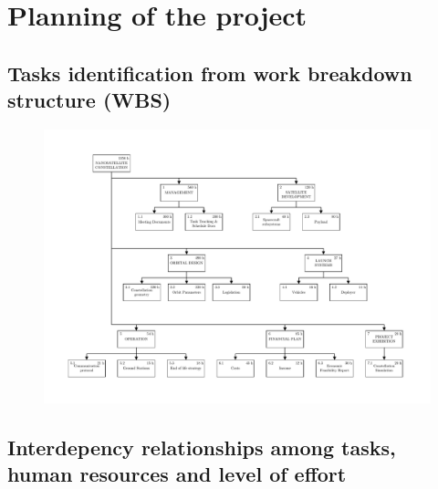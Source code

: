 \section{Planning of the project}

\subsection{Tasks identification from work breakdown structure (WBS)}
%
\begin{figure}[h]
\includegraphics[width=1.1\textwidth]{./external_pdf/G4-PC-WBS-10-04.pdf}
\end{figure}

\pagebreak


\subsection{Interdepency relationships among tasks, human resources and level of effort}




